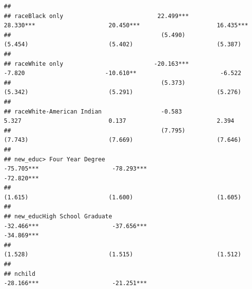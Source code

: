 \documentclass[
]{article}
\begin{document}
\begin{verbatim}
##                                                                                                                                                         
## raceBlack only                           22.499***                     28.330***                     20.450***                      16.435***           
##                                           (5.490)                       (5.454)                       (5.402)                        (5.387)            
##                                                                                                                                                         
## raceWhite only                          -20.163***                      -7.820                       -10.610**                        -6.522            
##                                           (5.373)                       (5.342)                       (5.291)                        (5.276)            
##                                                                                                                                                         
## raceWhite-American Indian                 -0.583                         5.327                         0.137                          2.394             
##                                           (7.795)                       (7.743)                       (7.669)                        (7.646)            
##                                                                                                                                                         
## new_educ> Four Year Degree                                            -75.705***                     -78.293***                     -72.820***          
##                                                                         (1.615)                       (1.600)                        (1.605)            
##                                                                                                                                                         
## new_educHigh School Graduate                                          -32.466***                     -37.656***                     -34.869***          
##                                                                         (1.528)                       (1.515)                        (1.512)            
##                                                                                                                                                         
## nchild                                                                                               -28.166***                     -21.251***          

\end{verbatim}
\end{document}
